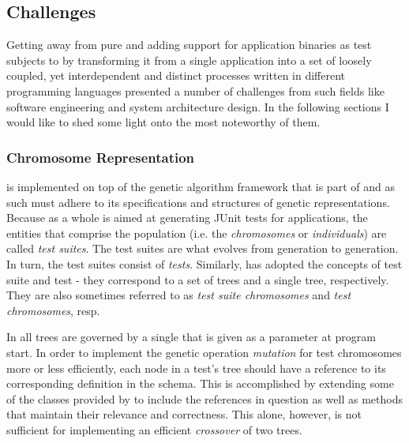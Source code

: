 \subsection{Challenges}
Getting away from pure \java and adding support for application binaries as test subjects 
to \xmlmate by transforming it from 
a single \java application into a set of loosely coupled, yet interdependent and distinct 
processes written in different programming languages presented a number of challenges from 
such fields like software engineering and system architecture design. 
In the following sections I would like to shed some light onto 
the most noteworthy of them.
\subsubsection{Chromosome Representation}
\label{sec:repr}
\xmlmate is implemented on top of the genetic algorithm framework that is part of 
\evosuite{}\cite{fraser2013whole} and as such must adhere to its specifications and structures 
of genetic representations. 
Because \evosuite as a whole is aimed at generating {\small JUnit} tests for \java applications, 
the entities that comprise the population  (i.e. the \emph{chromosomes} or \emph{individuals}) 
are called \emph{test suites}. The test suites are what evolves from generation to generation.
In turn, the test suites consist of \emph{tests}. Similarly, \xmlmate has adopted the concepts of 
test suite and test - they correspond to a set of \xml trees and a single \xml tree, respectively. 
They are also sometimes referred to as \emph{test suite chromosomes} and \emph{test chromosomes}, resp.

In \xmlmate all \xml trees are governed by a single \xsd that is given as a parameter at program start.
In order to implement the genetic operation \emph{mutation} for test chromosomes more or less 
efficiently, each node in a test's \xml tree should have a reference to its corresponding definition 
in the schema. This is accomplished by extending some of the \java classes provided by \xom to include the 
references in question as well as methods that maintain their relevance and correctness. This alone, 
however, is not sufficient for implementing an efficient \emph{crossover} of two \xml trees.

